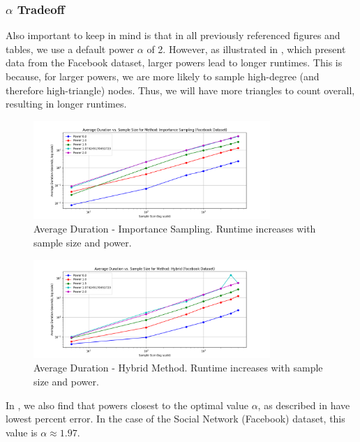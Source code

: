 \documentclass[11pt, margin=1in]{article}
\begin{document}
\subsubsection{$\alpha$ Tradeoff}

Also important to keep in mind is that in all previously referenced figures and tables, we use a default power $\alpha$ of 2.
However, as illustrated in , which present data from the Facebook dataset, larger powers lead to longer runtimes.
This is because, for larger powers, we are more likely to sample high-degree (and therefore high-triangle) nodes.
Thus, we will have more triangles to count overall, resulting in longer runtimes.

\begin{figure}[H]
    \centering
    \includegraphics[width=0.8\textwidth]{plots/durations/avg_duration_Importance Sampling.png}
    \caption{Average Duration - Importance Sampling. Runtime increases with sample size and power.}
    \label{fig:avg_duration_importance}
\end{figure}

\begin{figure}[H]
    \centering
    \includegraphics[width=0.8\textwidth]{plots/durations/avg_duration_Hybrid.png}
    \caption{Average Duration - Hybrid Method. Runtime increases with sample size and power.}
    \label{fig:avg_duration_variance_importance}
\end{figure}

In , we also find that powers closest to the optimal value $\alpha$, as described in  have lowest percent error.
In the case of the Social Network (Facebook) dataset, this value is $\alpha \approx 1.97$.
\end{document}
